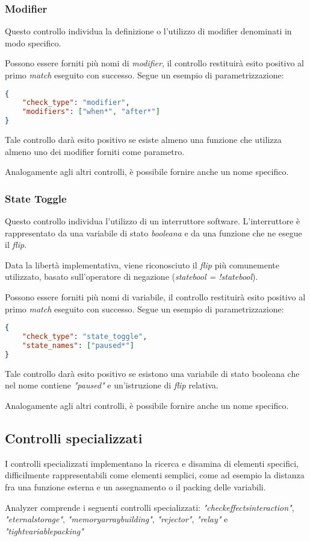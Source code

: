 \subsubsection{Modifier}
Questo controllo individua la definizione o l'utilizzo di modifier denominati in modo specifico.\par
Possono essere forniti più nomi di \textit{modifier}, il controllo restituirà esito positivo al primo \textit{match} eseguito con successo.
Segue un esempio di parametrizzazione:
{\begin{lstlisting}[language=json, caption={Parametrizzazione del controllo Modifier}]
{
	"check_type": "modifier",
	"modifiers": ["when*", "after*"]
}\end{lstlisting}}
\noindent Tale controllo darà esito positivo se esiste almeno una funzione che utilizza almeno uno dei modifier forniti come parametro.\par
Analogamente agli altri controlli, è possibile fornire anche un nome specifico.

\subsubsection{State Toggle}
Questo controllo individua l'utilizzo di un interruttore software. L'interruttore è rappresentato da una variabile di stato \textit{booleana} e da una funzione che ne esegue il \textit{flip}.\par
Data la libertà implementativa, viene riconosciuto il \textit{flip} più comunemente utilizzato, basato sull'operatore di negazione (\textit{state\textunderscore bool = !state\textunderscore bool}).\par
Possono essere forniti più nomi di variabile, il controllo restituirà esito positivo al primo \textit{match} eseguito con successo.
Segue un esempio di parametrizzazione:
{\begin{lstlisting}[language=json, caption={Parametrizzazione del controllo Comparison}]
{
	"check_type": "state_toggle",
	"state_names": ["paused*"]
}\end{lstlisting}}
\noindent Tale controllo darà esito positivo se esistono una variabile di stato booleana che nel nome contiene \textit{"paused"} e un'istruzione di \textit{flip} relativa.\par
Analogamente agli altri controlli, è possibile fornire anche un nome specifico.

\subsection{Controlli specializzati}
I controlli specializzati implementano la ricerca e disamina di elementi specifici, difficilmente rappresentabili come elementi semplici, come ad esempio la distanza fra una funzione esterna e un assegnamento o il packing delle variabili.\par
Analyzer comprende i seguenti controlli specializzati: \textit{"check\textunderscore effects\textunderscore interaction"}, \textit{"eternal\textunderscore storage"}, \textit{"memory\textunderscore array\textunderscore building"}, \textit{"rejector"}, \textit{"relay"} e \textit{"tight\textunderscore variable\textunderscore packing"}

